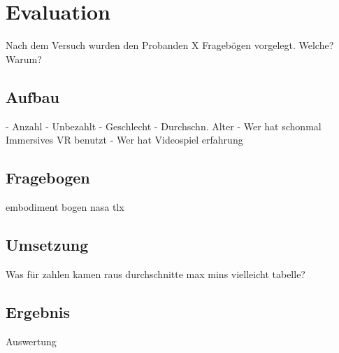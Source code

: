 \chapter{Evaluation}
Nach dem Versuch wurden den Probanden X Fragebögen vorgelegt.
Welche? Warum?

\section{Aufbau}
- Anzahl
- Unbezahlt
- Geschlecht
- Durchschn. Alter
- Wer hat schonmal Immersives VR benutzt
- Wer hat Videospiel erfahrung

\section{Fragebogen}
embodiment bogen \cite{Gonzalez-Franco2018}
nasa tlx \cite{HART1988}

\section{Umsetzung}
Was für zahlen kamen raus
durchschnitte max mins
vielleicht tabelle?

\section{Ergebnis}
Auswertung
